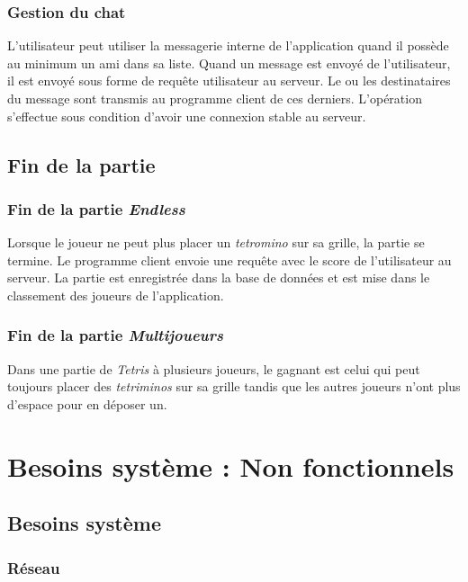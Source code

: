 \documentclass{article}
\begin{document}
\subsubsection{Gestion du chat}

L'utilisateur peut utiliser la messagerie interne de l'application quand il possède au minimum un ami dans sa liste. Quand un message est envoyé de l'utilisateur, il est envoyé sous forme de requête utilisateur au serveur. Le ou les destinataires du message sont transmis au programme client de ces derniers. L'opération s'effectue sous condition d'avoir une connexion stable au serveur.

\subsection{Fin de la partie}

\subsubsection{Fin de la partie \textit{Endless}}

Lorsque le joueur ne peut plus placer un \textit{tetromino} sur sa grille, la partie se termine. Le programme client envoie une requête avec le score de l'utilisateur au serveur. La partie est enregistrée dans la base de données et est mise dans le classement des joueurs de l'application. 

\subsubsection{Fin de la partie \textit{Multijoueurs}}

Dans une partie de \textit{Tetris} à plusieurs joueurs, le gagnant est celui qui peut toujours placer des \textit{tetriminos} sur sa grille tandis que les autres joueurs n'ont plus d'espace pour en déposer un.

\section{Besoins système : Non fonctionnels}

\subsection{Besoins système}

\subsubsection{Réseau}
\end{document}
